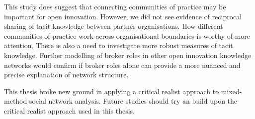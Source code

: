 This study does suggest that connecting communities of practice may be important for open innovation. However, we did not see evidence of reciprocal sharing of tacit knowledge between partner organisations. How different communities of practice work across organisational boundaries is worthy of more attention. There is also a need to investigate more robust measures of tacit knowledge. Further modelling of broker roles in other open innovation knowledge networks would confirm if broker roles alone can provide a more nuanced and precise explanation of network structure. \medskip 

This thesis broke new  ground in applying a critical realist approach to mixed-method social network analysis. Future studies should try an build upon the critical realist approach used in this thesis.
